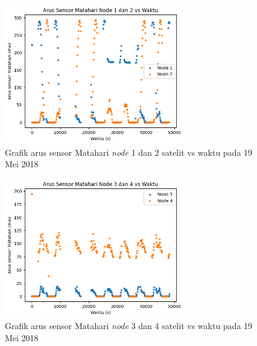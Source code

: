 \begin{figure}[H]
\setlength{}
\begin{center}
\includegraphics[width=0.7\textwidth]{fig/raw_node12_css_2018-05-19.png}
	\caption{Grafik arus sensor Matahari \textit{node} 1 dan 2 satelit vs waktu pada 19 Mei 2018}
\label{fig:rawcss1219}
\end{center}
\end{figure}

\begin{figure}[H]
\setlength{}
\begin{center}
\includegraphics[width=0.7\textwidth]{fig/raw_node34_css_2018-05-19.png}
	\caption{Grafik arus sensor Matahari \textit{node} 3 dan 4 satelit vs waktu pada 19 Mei 2018}
\label{fig:rawcss3419}
\end{center}
\end{figure}

